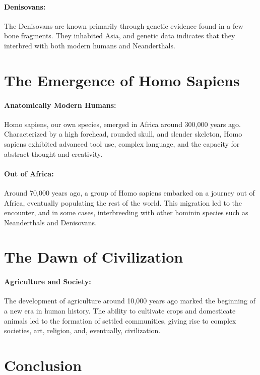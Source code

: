 \documentclass{book}
\begin{document}
\paragraph{Denisovans:}
The Denisovans are known primarily through genetic evidence found in a few bone fragments. They inhabited Asia, and genetic data indicates that they interbred with both modern humans and Neanderthals.

\section*{The Emergence of Homo Sapiens}

\paragraph{Anatomically Modern Humans:}
Homo sapiens, our own species, emerged in Africa around 300,000 years ago. Characterized by a high forehead, rounded skull, and slender skeleton, Homo sapiens exhibited advanced tool use, complex language, and the capacity for abstract thought and creativity.

\paragraph{Out of Africa:}
Around 70,000 years ago, a group of Homo sapiens embarked on a journey out of Africa, eventually populating the rest of the world. This migration led to the encounter, and in some cases, interbreeding with other hominin species such as Neanderthals and Denisovans.

\section*{The Dawn of Civilization}

\paragraph{Agriculture and Society:}
The development of agriculture around 10,000 years ago marked the beginning of a new era in human history. The ability to cultivate crops and domesticate animals led to the formation of settled communities, giving rise to complex societies, art, religion, and, eventually, civilization.

\section*{Conclusion}
\end{document}
